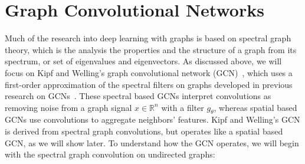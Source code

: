 
\section{Graph Convolutional Networks}
Much of the research into deep learning with graphs is based on spectral graph theory, which is the analysis the properties and the structure of a graph from its spectrum, or set of eigenvalues and eigenvectors. As discussed above, we will focus on Kipf and Welling's graph convolutional network (GCN)~\cite{Kipf2016}, which uses a first-order approximation of the spectral filters on graphs developed in previous research on GCNs~\cite{Bruna2013}. These spectral based GCNs interpret convolutions as removing noise from a graph signal $x \in \mathbb{R}^n$ with a filter $g_\theta$, whereas spatial based GCNs use convolutions to aggregate neighbors' features. Kipf and Welling's GCN is derived from spectral graph convolutions, but operates like a spatial based GCN, as we will show later. To understand how the GCN operates, we will begin with the spectral graph convolution on undirected graphs:

